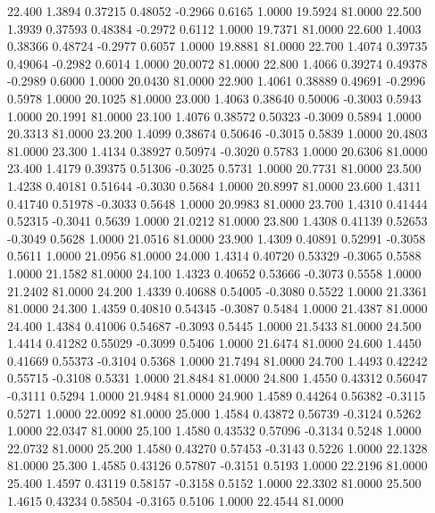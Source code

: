   22.400   1.3894   0.37215   0.48052  -0.2966   0.6165   1.0000  19.5924  81.0000
  22.500   1.3939   0.37593   0.48384  -0.2972   0.6112   1.0000  19.7371  81.0000
  22.600   1.4003   0.38366   0.48724  -0.2977   0.6057   1.0000  19.8881  81.0000
  22.700   1.4074   0.39735   0.49064  -0.2982   0.6014   1.0000  20.0072  81.0000
  22.800   1.4066   0.39274   0.49378  -0.2989   0.6000   1.0000  20.0430  81.0000
  22.900   1.4061   0.38889   0.49691  -0.2996   0.5978   1.0000  20.1025  81.0000
  23.000   1.4063   0.38640   0.50006  -0.3003   0.5943   1.0000  20.1991  81.0000
  23.100   1.4076   0.38572   0.50323  -0.3009   0.5894   1.0000  20.3313  81.0000
  23.200   1.4099   0.38674   0.50646  -0.3015   0.5839   1.0000  20.4803  81.0000
  23.300   1.4134   0.38927   0.50974  -0.3020   0.5783   1.0000  20.6306  81.0000
  23.400   1.4179   0.39375   0.51306  -0.3025   0.5731   1.0000  20.7731  81.0000
  23.500   1.4238   0.40181   0.51644  -0.3030   0.5684   1.0000  20.8997  81.0000
  23.600   1.4311   0.41740   0.51978  -0.3033   0.5648   1.0000  20.9983  81.0000
  23.700   1.4310   0.41444   0.52315  -0.3041   0.5639   1.0000  21.0212  81.0000
  23.800   1.4308   0.41139   0.52653  -0.3049   0.5628   1.0000  21.0516  81.0000
  23.900   1.4309   0.40891   0.52991  -0.3058   0.5611   1.0000  21.0956  81.0000
  24.000   1.4314   0.40720   0.53329  -0.3065   0.5588   1.0000  21.1582  81.0000
  24.100   1.4323   0.40652   0.53666  -0.3073   0.5558   1.0000  21.2402  81.0000
  24.200   1.4339   0.40688   0.54005  -0.3080   0.5522   1.0000  21.3361  81.0000
  24.300   1.4359   0.40810   0.54345  -0.3087   0.5484   1.0000  21.4387  81.0000
  24.400   1.4384   0.41006   0.54687  -0.3093   0.5445   1.0000  21.5433  81.0000
  24.500   1.4414   0.41282   0.55029  -0.3099   0.5406   1.0000  21.6474  81.0000
  24.600   1.4450   0.41669   0.55373  -0.3104   0.5368   1.0000  21.7494  81.0000
  24.700   1.4493   0.42242   0.55715  -0.3108   0.5331   1.0000  21.8484  81.0000
  24.800   1.4550   0.43312   0.56047  -0.3111   0.5294   1.0000  21.9484  81.0000
  24.900   1.4589   0.44264   0.56382  -0.3115   0.5271   1.0000  22.0092  81.0000
  25.000   1.4584   0.43872   0.56739  -0.3124   0.5262   1.0000  22.0347  81.0000
  25.100   1.4580   0.43532   0.57096  -0.3134   0.5248   1.0000  22.0732  81.0000
  25.200   1.4580   0.43270   0.57453  -0.3143   0.5226   1.0000  22.1328  81.0000
  25.300   1.4585   0.43126   0.57807  -0.3151   0.5193   1.0000  22.2196  81.0000
  25.400   1.4597   0.43119   0.58157  -0.3158   0.5152   1.0000  22.3302  81.0000
  25.500   1.4615   0.43234   0.58504  -0.3165   0.5106   1.0000  22.4544  81.0000

